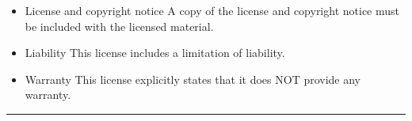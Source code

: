 \documentclass[letterpaper,10pt,english]{sphinxmanual}
\begin{document}
\begin{itemize}
\item {}
License and copyright notice \textendash{} A copy of the license and copyright notice must be included with the licensed material.

\end{itemize}

\vspace{10px}

\begin{itemize}
\item {}
Liability \textendash{} This license includes a limitation of liability.

\item {}
Warranty \textendash{} This license explicitly states that it does NOT provide any warranty.

\end{itemize}

\begin{flushright}



\end{flushright}


\bigskip\hrule\bigskip
\end{document}
